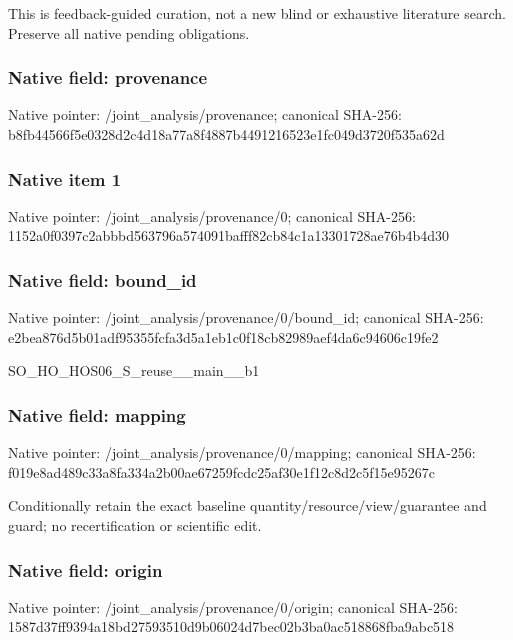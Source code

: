 \documentclass[10pt,a4paper]{article}
\begin{document}
\begingroup\raggedright\sloppy This is feedback-guided curation,\allowbreak{} not a new blind or exhaustive literature search. Preserve all native pending obligations.\par\endgroup

\subsubsection{Native field: provenance}
Native pointer: /joint\_\allowbreak{}analysis/provenance; canonical SHA-256: b8fb44566f5e0328d2c4d18a77a8f4887b4491216523e1fc049d3720f535a62d

\subsubsection{Native item 1}
Native pointer: /joint\_\allowbreak{}analysis/provenance/0; canonical SHA-256: 1152a0f0397c2abbbd563796a574091bafff82cb84c1a13301728ae76b4b4d30

\subsubsection{Native field: bound\_\allowbreak{}id}
Native pointer: /joint\_\allowbreak{}analysis/provenance/0/bound\_\allowbreak{}id; canonical SHA-256: e2bea876d5b01adf95355fcfa3d5a1eb1c0f18cb82989aef4da6c94606c19fe2

\begingroup\raggedright\sloppy SO\_\allowbreak{}HO\_\allowbreak{}HOS06\_\allowbreak{}S\_\allowbreak{}reuse\_\allowbreak{}\_\allowbreak{}main\_\allowbreak{}\_\allowbreak{}b1\par\endgroup

\subsubsection{Native field: mapping}
Native pointer: /joint\_\allowbreak{}analysis/provenance/0/mapping; canonical SHA-256: f019e8ad489c33a8fa334a2b00ae67259fcdc25af30e1f12c8d2c5f15e95267c

\begingroup\raggedright\sloppy Conditionally retain the exact baseline quantity/\allowbreak{}resource/\allowbreak{}view/\allowbreak{}guarantee and guard;\allowbreak{} no recertification or scientific edit.\par\endgroup

\subsubsection{Native field: origin}
Native pointer: /joint\_\allowbreak{}analysis/provenance/0/origin; canonical SHA-256: 1587d37ff9394a18bd27593510d9b06024d7bec02b3ba0ac518868fba9abc518
\end{document}
